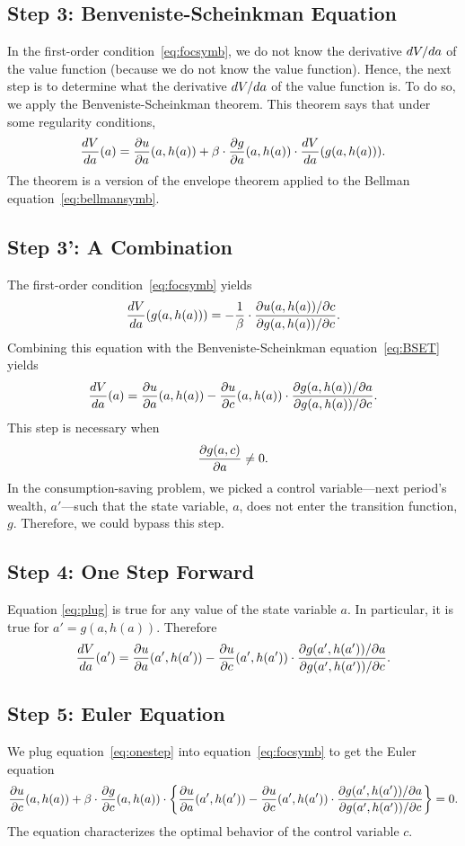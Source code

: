 \documentclass[letterpaper,12pt,leqno]{article}
\begin{document}
\subsection{Step 3: Benveniste-Scheinkman Equation}

In the first-order condition~\eqref{eq:focsymb}, we do not know  the derivative $d V/d a$ of the value function (because we do not know the value function). Hence, the next step is to determine what the derivative $d V/d a$ of the value function is. To do so, we apply the Benveniste-Scheinkman theorem. This theorem says that under some regularity conditions,
\begin{align}
\frac{d V}{d a}(a)=\frac{\partial  u}{\partial a}(a,h(a))+\beta\cdot \frac{\partial  g}{\partial a}(a,h(a))\cdot \frac{d V}{d a}(g(a,h(a))).\label{eq:BSET}
\end{align}
The theorem is a version of the envelope theorem applied to the Bellman equation~\eqref{eq:bellmansymb}.

\subsection{Step 3': A Combination}

The first-order condition~\eqref{eq:focsymb} yields
\begin{align}
\frac{d V}{d a}(g(a,h(a)))=-\frac{1}{\beta}\cdot \frac{\partial u(a,h(a))/\partial c}{\partial g(a,h(a))/\partial c}.
\end{align}
Combining this equation with the Benveniste-Scheinkman equation~\eqref{eq:BSET} yields
\begin{align}
\frac{d V}{d a}(a)=\frac{\partial u}{\partial a}(a,h(a))-\frac{\partial u}{\partial c}(a,h(a))\cdot \frac{\partial g(a,h(a))/\partial a}{\partial g(a,h(a))/\partial c}.\label{eq:plug}
\end{align}
This step is necessary when \[\frac{\partial g(a,c)}{\partial a}\neq 0.\] In the consumption-saving problem, we picked a control variable---next period's wealth, $a'$---such that the state variable, $a$, does not enter the transition function, $g$. Therefore, we could bypass this step.

\subsection{Step 4: One Step Forward}

Equation \eqref{eq:plug} is true for any value of the state variable $a$. In particular, it is true for $a'=g(a,h(a))$. Therefore
\begin{align}
\frac{d V}{d a}(a')=\frac{\partial u}{\partial a}(a',h(a'))-\frac{\partial u}{\partial c}(a',h(a'))\cdot \frac{\partial g(a',h(a'))/\partial a}{\partial g(a',h(a'))/\partial c}.\label{eq:onestep}
\end{align}

\subsection{Step 5: Euler Equation}

We plug equation~\eqref{eq:onestep} into equation~\eqref{eq:focsymb} to get the Euler equation
\begin{equation*}
\frac{\partial u}{\partial c}(a,h(a))+\beta \cdot \frac{\partial g}{\partial c}(a,h(a)) \cdot \left\lbrace \frac{\partial  u}{\partial a}(a',h(a'))-\frac{\partial u}{\partial c}(a',h(a')) \cdot \frac{\partial g(a',h(a'))/\partial a}{\partial g(a',h(a'))/\partial c} \right\rbrace=0.
\end{equation*}
The equation characterizes the optimal behavior of the control variable $c$.
\end{document}
